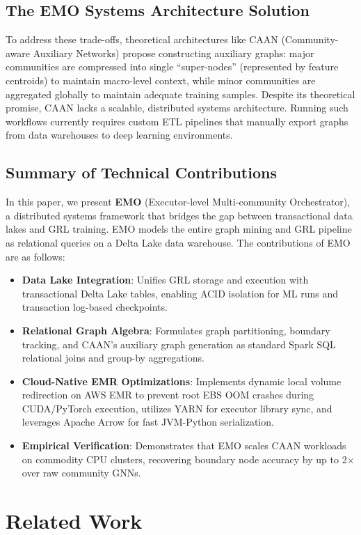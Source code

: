 \documentclass[conference,compsoc]{IEEEtran}
\begin{document}
\subsection{The EMO Systems Architecture Solution}
To address these trade-offs, theoretical architectures like CAAN (Community-aware Auxiliary Networks) propose constructing auxiliary graphs: major communities are compressed into single ``super-nodes'' (represented by feature centroids) to maintain macro-level context, while minor communities are aggregated globally to maintain adequate training samples. Despite its theoretical promise, CAAN lacks a scalable, distributed systems architecture. Running such workflows currently requires custom ETL pipelines that manually export graphs from data warehouses to deep learning environments.

\subsection{Summary of Technical Contributions}
In this paper, we present \textbf{EMO} (Executor-level Multi-community Orchestrator), a distributed systems framework that bridges the gap between transactional data lakes and GRL training. EMO models the entire graph mining and GRL pipeline as relational queries on a Delta Lake data warehouse. The contributions of EMO are as follows:
\begin{itemize}
    \item \textbf{Data Lake Integration}: Unifies GRL storage and execution with transactional Delta Lake tables, enabling ACID isolation for ML runs and transaction log-based checkpoints.
    \item \textbf{Relational Graph Algebra}: Formulates graph partitioning, boundary tracking, and CAAN's auxiliary graph generation as standard Spark SQL relational joins and group-by aggregations.
    \item \textbf{Cloud-Native EMR Optimizations}: Implements dynamic local volume redirection on AWS EMR to prevent root EBS OOM crashes during CUDA/PyTorch execution, utilizes YARN for executor library sync, and leverages Apache Arrow for fast JVM-Python serialization.
    \item \textbf{Empirical Verification}: Demonstrates that EMO scales CAAN workloads on commodity CPU clusters, recovering boundary node accuracy by up to 2$\times$ over raw community GNNs.
\end{itemize}

\section{Related Work}
\end{document}
